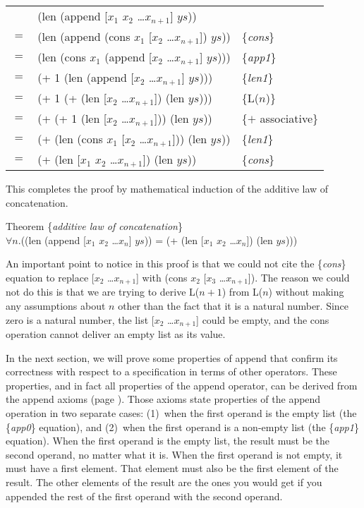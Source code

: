 \begin{center}
\begin{tabular}{lll}
    & (len (append [$x_1$ $x_2$ \dots $x_{n+1}$] $ys$))         &                     \\
$=$ & (len (append (cons $x_1$ [$x_2$ \dots $x_{n+1}$]) $ys$))  & \{\emph{cons}\}     \\
$=$ & (len (cons $x_1$ (append [$x_2$ \dots $x_{n+1}$] $ys$)))  & \{\emph{app1}\}     \\
$=$ & (+ 1 (len (append [$x_2$ \dots $x_{n+1}$] $ys$)))         & \{\emph{len1}\}     \\
$=$ & (+ 1 (+ (len [$x_2$ \dots $x_{n+1}$]) (len $ys$)))        & \{L($n$)\}          \\
$=$ & (+ (+ 1 (len [$x_2$ \dots $x_{n+1}$])) (len $ys$))        & \{$+$ associative\} \\
$=$ & (+ (len (cons $x_1$ [$x_2$ \dots $x_{n+1}$])) (len $ys$)) & \{\emph{len1}\}     \\
$=$ & (+ (len [$x_1$ $x_2$ \dots $x_{n+1}$]) (len $ys$))        & \{\emph{cons}\}     \\
\end{tabular}
\end{center}

This completes the proof by mathematical induction of the
additive law of concatenation.
\begin{samepage}
\begin{center}
\label{additive-law-concatenation}
Theorem \{\emph{additive law of concatenation}\} \\
$\forall$$n$.((len (append [$x_1$ $x_2$ \dots $x_n$] $ys$))
= (+ (len [$x_1$ $x_2$ \dots $x_n$]) (len $ys$)))
\end{center}
\end{samepage}

An important point to notice in this proof is that
we could not cite the \{\emph{cons}\} equation to replace [$x_2$ \dots $x_{n+1}$]
with (cons $x_2$ [$x_3$ \dots $x_{n+1}$]).
The reason we could not do this is that we are trying to derive
L($n+1$) from L($n$) without making any assumptions about $n$
other than the fact that it is a natural number.
Since zero is a natural number, the list [$x_2$ \dots $x_{n+1}$]
could be empty, and the cons operation cannot deliver an empty list as its value.

In the next section, we will prove some properties of append
that confirm its correctness with respect to a specification in terms of other operators.
These properties, and in fact all properties of the append operator,
can be derived from the append axioms (page \pageref{append-equations}).
Those axioms state properties of the append operation in two separate cases:
(1)~when the first operand is the empty list (the \{\emph{app0}\} equation), and
(2)~when the first operand is a non-empty list (the \{\emph{app1}\} equation).
When the first operand is the empty list,
the result must be the second operand, no matter what it is.
When the first operand is not empty, it must have a first element.
That element must also be the first element of the result.
The other elements of the result are the ones you would get
if you appended the rest of the first operand with the second operand.

